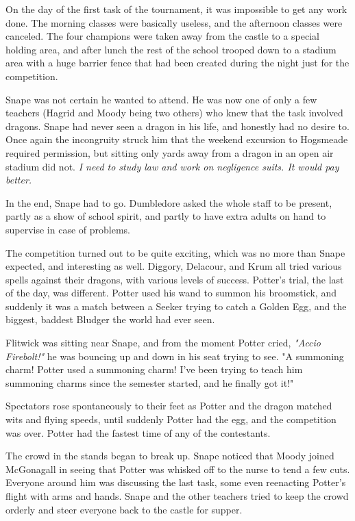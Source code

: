 On the day of the first task of the tournament, it was impossible to get any work done. The morning classes were basically useless, and the afternoon classes were canceled. The four champions were taken away from the castle to a special holding area, and after lunch the rest of the school trooped down to a stadium area with a huge barrier fence that had been created during the night just for the competition.

Snape was not certain he wanted to attend. He was now one of only a few teachers (Hagrid and Moody being two others) who knew that the task involved dragons. Snape had never seen a dragon in his life, and honestly had no desire to. Once again the incongruity struck him that the weekend excursion to Hogsmeade required permission, but sitting only yards away from a dragon in an open air stadium did not. \emph{I need to study law and work on negligence suits. It would pay better.}

In the end, Snape had to go. Dumbledore asked the whole staff to be present, partly as a show of school spirit, and partly to have extra adults on hand to supervise in case of problems.

The competition turned out to be quite exciting, which was no more than Snape expected, and interesting as well. Diggory, Delacour, and Krum all tried various spells against their dragons, with various levels of success. Potter's trial, the last of the day, was different. Potter used his wand to summon his broomstick, and suddenly it was a match between a Seeker trying to catch a Golden Egg, and the biggest, baddest Bludger the world had ever seen.

Flitwick was sitting near Snape, and from the moment Potter cried, \emph{"Accio Firebolt!"} he was bouncing up and down in his seat trying to see. "A summoning charm! Potter used a summoning charm! I've been trying to teach him summoning charms since the semester started, and he finally got it!"

Spectators rose spontaneously to their feet as Potter and the dragon matched wits and flying speeds, until suddenly Potter had the egg, and the competition was over. Potter had the fastest time of any of the contestants.

The crowd in the stands began to break up. Snape noticed that Moody joined McGonagall in seeing that Potter was whisked off to the nurse to tend a few cuts. Everyone around him was discussing the last task, some even reenacting Potter's flight with arms and hands. Snape and the other teachers tried to keep the crowd orderly and steer everyone back to the castle for supper.

